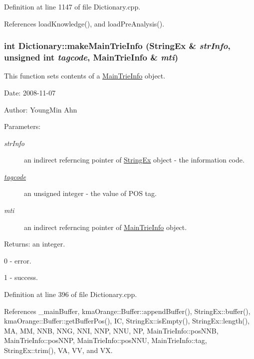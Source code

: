 Definition at line 1147 of file Dictionary.cpp.

References loadKnowledge(), and loadPreAnalysis().\hypertarget{classkmaOrange_1_1Dictionary_49b4c3ca79471264e213d12e12d8333c}{
\subsubsection[{makeMainTrieInfo}]{\setlength{\rightskip}{0pt plus 5cm}int Dictionary::makeMainTrieInfo ({\bf StringEx} \& {\em strInfo}, \/  unsigned int {\em tagcode}, \/  {\bf MainTrieInfo} \& {\em mti})}}
\label{classkmaOrange_1_1Dictionary_49b4c3ca79471264e213d12e12d8333c}


This function sets contents of a \hyperlink{classMainTrieInfo}{MainTrieInfo} object. 

\begin{Desc}
\item[Date:]2008-11-07 \end{Desc}
\begin{Desc}
\item[Author:]YoungMin Ahn \end{Desc}
\begin{Desc}
\item[Parameters:]
\begin{description}
\item[{\em strInfo}]an indirect referncing pointer of \hyperlink{classStringEx}{StringEx} object - the information code. \item[{\em \hyperlink{structkmaOrange_1_1tagcode}{tagcode}}]an unsigned integer - the value of POS tag. \item[{\em mti}]an indirect referncing pointer of \hyperlink{classMainTrieInfo}{MainTrieInfo} object. \end{description}
\end{Desc}
\begin{Desc}
\item[Returns:]an integer.\par
 0 - error.\par
 1 - success. \end{Desc}


Definition at line 396 of file Dictionary.cpp.

References \_\-mainBuffer, kmaOrange::Buffer::appendBuffer(), StringEx::buffer(), kmaOrange::Buffer::getBufferPos(), IC, StringEx::isEmpty(), StringEx::length(), MA, MM, NNB, NNG, NNI, NNP, NNU, NP, MainTrieInfo::posNNB, MainTrieInfo::posNNP, MainTrieInfo::posNNU, MainTrieInfo::tag, StringEx::trim(), VA, VV, and VX.

